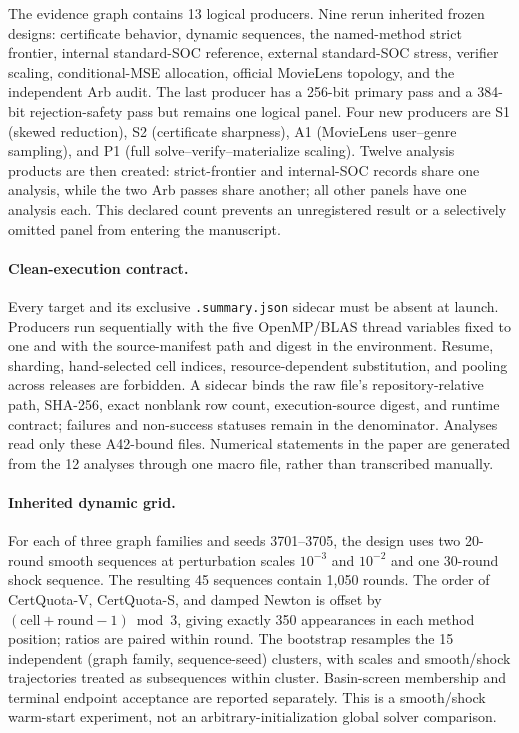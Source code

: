 The evidence graph contains 13 logical producers.  Nine rerun inherited frozen
designs: certificate behavior, dynamic sequences, the named-method strict
frontier, internal standard-SOC reference, external standard-SOC stress,
verifier scaling, conditional-MSE allocation, official MovieLens topology, and
the independent Arb audit.  The last producer has a 256-bit primary pass and a
384-bit rejection-safety pass but remains one logical panel.  Four new
producers are S1 (skewed reduction), S2 (certificate sharpness), A1 (MovieLens
user--genre sampling), and P1 (full solve--verify--materialize scaling).  Twelve
analysis products are then created: strict-frontier and internal-SOC records
share one analysis, while the two Arb passes share another; all other panels
have one analysis each.  This declared count prevents an unregistered result or
a selectively omitted panel from entering the manuscript.

\paragraph{Clean-execution contract.}
Every target and its exclusive \texttt{.summary.json} sidecar must be absent at
launch.  Producers run sequentially with the five OpenMP/BLAS thread variables
fixed to one and with the source-manifest path and digest in the environment.
Resume, sharding, hand-selected cell indices, resource-dependent substitution,
and pooling across releases are forbidden.  A sidecar binds the raw file's
repository-relative path, SHA-256, exact nonblank row count, execution-source
digest, and runtime contract; failures and non-success statuses remain in the
denominator.  Analyses read only these A42-bound files.  Numerical statements in
the paper are generated from the 12 analyses through one macro file, rather
than transcribed manually.

\paragraph{Inherited dynamic grid.}
For each of three graph families and seeds 3701--3705, the design uses two
20-round smooth sequences at perturbation scales $10^{-3}$ and $10^{-2}$ and
one 30-round shock sequence.  The resulting 45 sequences contain 1,050 rounds.
The order of CertQuota-V, CertQuota-S, and damped Newton is offset by
$(\text{cell}+\text{round}-1)\bmod3$, giving exactly 350 appearances in each
method position; ratios are paired within round.  The bootstrap resamples the
15 independent (graph family, sequence-seed) clusters, with scales and
smooth/shock trajectories treated as subsequences within cluster.  Basin-screen
membership and terminal endpoint acceptance are reported separately.  This is
a smooth/shock warm-start experiment, not an arbitrary-initialization global
solver comparison.

